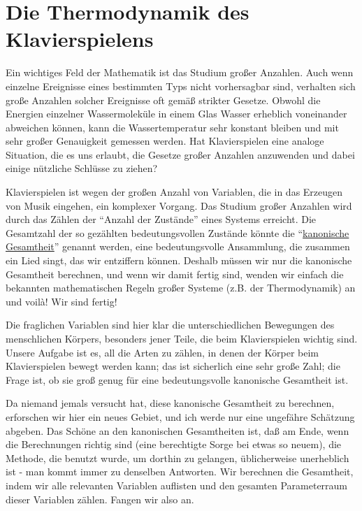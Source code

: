 
\section{Die Thermodynamik des Klavierspielens}
\label{c1iv3}

Ein wichtiges Feld der Mathematik ist das Studium großer Anzahlen.
Auch wenn einzelne Ereignisse eines bestimmten Typs nicht vorhersagbar sind, verhalten sich große Anzahlen solcher Ereignisse oft gemäß strikter Gesetze.
Obwohl die Energien einzelner Wassermoleküle in einem Glas Wasser erheblich voneinander abweichen können, kann die Wassertemperatur sehr konstant bleiben und mit sehr großer Genauigkeit gemessen werden.
Hat Klavierspielen eine analoge Situation, die es uns erlaubt, die Gesetze großer Anzahlen anzuwenden und dabei einige nützliche Schlüsse zu ziehen?


\hypertarget{canonic}{}

Klavierspielen ist wegen der großen Anzahl von Variablen, die in das Erzeugen von Musik eingehen, ein komplexer Vorgang.
Das Studium großer Anzahlen wird durch das Zählen der \enquote{Anzahl der Zustände} eines Systems erreicht.
Die Gesamtzahl der so gezählten bedeutungsvollen Zustände könnte die \enquote{\hyperref[ueb-canonic]{kanonische Gesamtheit}} genannt werden, eine bedeutungsvolle Ansammlung, die zusammen ein Lied singt, das wir entziffern können.
Deshalb müssen wir nur die kanonische Gesamtheit berechnen, und wenn wir damit fertig sind, wenden wir einfach die bekannten mathematischen Regeln großer Systeme (z.B. der Thermodynamik) an und voilà!
Wir sind fertig!

Die fraglichen Variablen sind hier klar die unterschiedlichen Bewegungen des menschlichen Körpers, besonders jener Teile, die beim Klavierspielen wichtig sind.
Unsere Aufgabe ist es, all die Arten zu zählen, in denen der Körper beim Klavierspielen bewegt werden kann; das ist sicherlich eine sehr große Zahl; die Frage ist, ob sie groß genug für eine bedeutungsvolle kanonische Gesamtheit ist.

Da niemand jemals versucht hat, diese kanonische Gesamtheit zu berechnen, erforschen wir hier ein neues Gebiet, und ich werde nur eine ungefähre Schätzung abgeben.
Das Schöne an den kanonischen Gesamtheiten ist, daß am Ende, wenn die Berechnungen richtig sind (eine berechtigte Sorge bei etwas so neuem), die Methode, die benutzt wurde, um dorthin zu gelangen, üblicherweise unerheblich ist - man kommt immer zu denselben Antworten.
Wir berechnen die Gesamtheit, indem wir alle relevanten Variablen auflisten und den gesamten Parameterraum dieser Variablen zählen.
Fangen wir also an.

